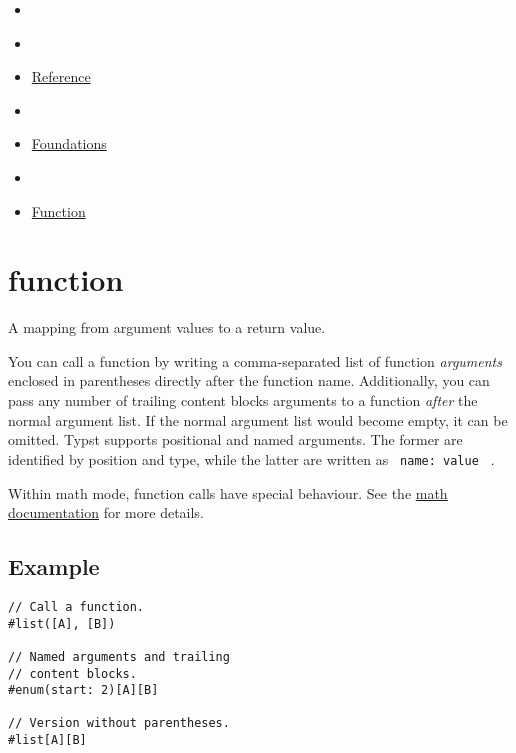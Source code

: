 \begin{itemize}
\tightlist
\item
  \href{/docs}{}
\item
  
\item
  \href{/docs/reference/}{Reference}
\item
  
\item
  \href{/docs/reference/foundations/}{Foundations}
\item
  
\item
  \href{/docs/reference/foundations/function/}{Function}
\end{itemize}

\section{\texorpdfstring{{ function }}{ function }}\label{summary}

A mapping from argument values to a return value.

You can call a function by writing a comma-separated list of function
\emph{arguments} enclosed in parentheses directly after the function
name. Additionally, you can pass any number of trailing content blocks
arguments to a function \emph{after} the normal argument list. If the
normal argument list would become empty, it can be omitted. Typst
supports positional and named arguments. The former are identified by
position and type, while the latter are written as
\texttt{\ name:\ value\ } .

Within math mode, function calls have special behaviour. See the
\href{/docs/reference/math/}{math documentation} for more details.

\subsection{Example}\label{example}

\begin{verbatim}
// Call a function.
#list([A], [B])

// Named arguments and trailing
// content blocks.
#enum(start: 2)[A][B]

// Version without parentheses.
#list[A][B]
\end{verbatim}


